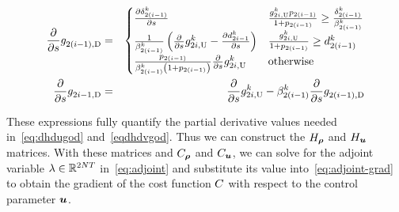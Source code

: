 \begin{eqnarray*}
\frac{\partial}{\partial s}g_{2\left(i-1\right),\text{D}}^{} & = & \begin{cases}
\frac{\partial\delta_{2\left(i-1\right)}^{k}}{\partial s} & \frac{g_{2i,\text{U}}^{k}p_{2(i-1)}}{1+p_{2(i-1)}}\ge\frac{\delta_{2\left(i-1\right)}^{k}}{\beta_{2\left(i-1\right)}^{k}}\\
\frac{1}{\beta_{2\left(i-1\right)}^{k}}\left(\frac{\partial}{\partial s}g_{2i,\text{U}}^{k}-\frac{\partial d_{2i-1}^{k}}{\partial s}\right) & \frac{g_{2i,\text{U}}^{k}}{1+p_{2(i-1)}}\ge d_{2\left(i-1\right)}^{k}\\
\frac{p_{2(i-1)}}{\beta_{2\left(i-1\right)}^{k}\left(1+p_{2(i-1)}\right)}\frac{\partial}{\partial s}g_{2i,\text{U}}^{k} & \text{otherwise}
\end{cases}\\
\frac{\partial}{\partial s}g_{2i-1,\text{D}}^{} & = & \frac{\partial}{\partial s}g_{2i,\text{U}}^{k}-\beta_{2\left(i-1\right)}^{k}\frac{\partial}{\partial s}g_{2\left(i-1\right),\text{D}}^{}
\end{eqnarray*}


These expressions fully quantify the partial derivative values needed
in~\eqref{eq:dhdugod} and~\eqref{eqdhdvgod}. Thus we can construct
the $\Hx$ and $\Hu$ matrices. With these matrices and $\Jx$ and
$\Ju$, we can solve for the adjoint variable $\lambda\in\mathbb{R}^{2NT}$
in~\eqref{eq:adjoint} and substitute its value into~\eqref{eq:adjoint-grad}
to obtain the gradient of the cost function $C$ with respect
to the control parameter $\control$.
